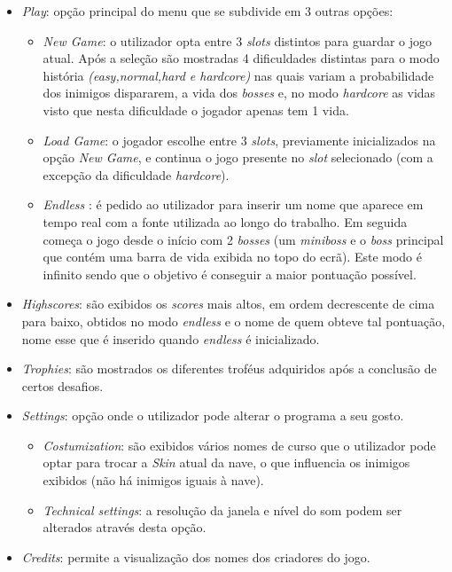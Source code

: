 \documentclass[a4paper,11pt]{article}
\begin{document}
\begin{itemize}
    \item \textit{Play}: opção principal do menu que se subdivide em 3 outras opções:
        \begin{itemize}
    \item \textit{New Game}: o utilizador opta entre 3 \textit{slots} distintos para guardar o jogo atual. Após a seleção são mostradas 4 dificuldades distintas para o modo história\textit{ (easy,normal,hard e hardcore)} nas quais variam a probabilidade dos inimigos dispararem, a vida dos \textit{bosses} e, no modo \textit{hardcore} as vidas visto que nesta dificuldade o jogador apenas tem 1 vida.

    \item \textit{Load Game}: o jogador escolhe entre 3 \textit{slots}, previamente inicializados na opção \textit{New Game}, e continua o jogo presente no \textit{slot} selecionado (com a excepção da dificuldade \textit{hardcore}).

    \item   \textit{Endless} : é pedido ao utilizador para inserir um nome que aparece em tempo real com a fonte utilizada ao longo do trabalho. Em seguida começa o jogo desde o início com 2 \textit{bosses} (um \textit{miniboss} e o \textit{boss} principal que contém uma barra de vida exibida no topo do ecrã). Este modo é infinito sendo que o objetivo é conseguir a maior pontuação possível.
        \end{itemize}

    \item  \textit{Highscores}: são exibidos os \textit{scores }mais altos, em ordem decrescente de cima para baixo, obtidos no modo \textit{endless} e o nome de quem obteve tal pontuação, nome esse que é inserido quando \textit{endless} é inicializado.

    \item \textit{Trophies}: são mostrados os diferentes troféus adquiridos após a conclusão de certos desafios.
    \item \textit{Settings}: opção onde o utilizador pode alterar o programa a seu gosto.
          \begin{itemize}
              \item  \textit{Costumization}: são exibidos vários nomes de curso que o utilizador pode optar para trocar a \textit{Skin} atual da nave, o que influencia os inimigos exibidos (não há inimigos iguais à nave).
              \item  \textit{Technical settings}: a resolução da janela e nível do som podem ser alterados através desta opção.
          \end{itemize}
    \item \textit{Credits}: permite a visualização dos nomes dos criadores do jogo.
\end{itemize}
\end{document}
